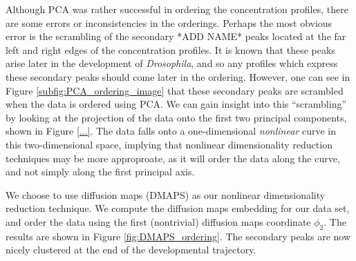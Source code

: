 \documentclass[10pt]{article}
\begin{document}
Although PCA was rather successful in ordering the concentration profiles, there are some errors or inconsistencies in the orderings.
%
Perhaps the most obvious error is the scrambling of the secondary *ADD NAME* peaks located at the far left and right edges of the concentration profiles.
%
It is known that these peaks arise later in the development of {\em Drosophila}, and so any profiles which express these secondary peaks should come later in the ordering.
%
However, one can see in Figure \ref{subfig:PCA_ordering_image} that these secondary peaks are scrambled when the data is ordered using PCA.
%
We can gain insight into this ``scrambling'' by looking at the projection of the data onto the first two principal components, shown in Figure \ref{...}.
%
The data falls onto a one-dimensional {\em nonlinear} curve in this two-dimensional space, implying that nonlinear dimensionality reduction techniques may be more approproate, as it will order the data along the curve, and not simply along the first principal axis.

We choose to use diffusion maps (DMAPS) as our nonlinear dimensionality reduction technique.
%
We compute the diffusion maps embedding for our data set, and order the data using the first (nontrivial) diffusion maps coordinate $\phi_2$. 
%
The results are shown in Figure \ref{fig:DMAPS_ordering}.
%
The secondary peaks are now nicely clustered at the end of the developmental trajectory.
\end{document}
